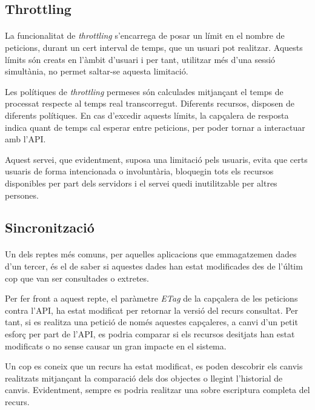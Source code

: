     \subsection{Throttling}

        \paragraph{}
        La funcionalitat de \emph{throttling} s'encarrega de posar un límit en el nombre de peticions, durant un cert interval de temps, que un usuari pot realitzar. Aquests límits són creats en l'àmbit d'usuari i per tant, utilitzar més d'una sessió simultània, no permet saltar-se aquesta limitació.

        Les polítiques de \emph{throttling} permeses són calculades mitjançant el temps de processat respecte al temps real transcorregut. Diferents recursos, disposen de diferents polítiques. En cas d'excedir aquests límits, la capçalera de resposta indica quant de temps cal esperar entre peticions, per poder tornar a interactuar amb l'API.

        Aquest servei, que evidentment, suposa una limitació pels usuaris, evita que certs usuaris de forma intencionada o involuntària, bloquegin tots els recursos disponibles per part dels servidors i el servei quedi inutilitzable per altres persones.


    \subsection{Sincronització}

        \paragraph{}
        Un dels reptes més comuns, per aquelles aplicacions que emmagatzemen dades d'un tercer, és el de saber si aquestes dades han estat modificades des de l'últim cop que van ser consultades o extretes.

        Per fer front a aquest repte, el paràmetre \emph{ETag} de la capçalera de les peticions contra l'API, ha estat modificat per retornar la versió del recurs consultat. Per tant, si es realitza una petició de només aquestes capçaleres, a canvi d'un petit esforç per part de l'API, es podria comparar si els recursos desitjats han estat modificats o no sense causar un gran impacte en el sistema.

        Un cop es coneix que un recurs ha estat modificat, es poden descobrir els canvis realitzats mitjançant la comparació dels dos objectes o llegint l'historial de canvis. Evidentment, sempre es podria realitzar una sobre escriptura completa del recurs.


